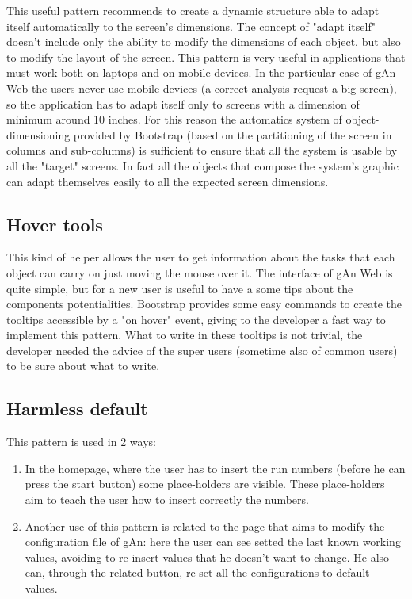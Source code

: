 This useful pattern recommends to create a dynamic structure able to adapt itself automatically to the screen's dimensions. The concept of "adapt itself" doesn't include only the ability to modify the dimensions of each object, but also to modify the layout of the screen. This pattern is very useful in applications that must work both on laptops and on mobile devices. In the particular case of gAn Web the users never use mobile devices (a correct analysis request a big screen), so the application has to adapt itself only to screens with a dimension of minimum around 10 inches. For this reason the automatics system of object-dimensioning provided by Bootstrap (based on the partitioning of the screen in columns and sub-columns) is sufficient to ensure that all the system is usable by all the "target" screens. In fact all the objects that compose the system's graphic can adapt themselves easily to all the expected screen dimensions. 


\subsection{Hover tools}

This kind of helper allows the user to get information about the tasks that each object can carry on just moving the mouse over it. 
The interface of gAn Web is quite simple, but for a new user is useful to have a some tips about the components potentialities. Bootstrap provides some easy commands to create the tooltips accessible by a "on hover" event, giving to the developer a fast way to implement this pattern. What to write in these tooltips is not trivial, the developer needed the advice of the super users (sometime also of common users) to be sure about what to write. 


\subsection{Harmless default}

This pattern is used in 2 ways:
\begin{enumerate}

\item In the homepage, where the user has to insert the run numbers (before he can press the start button) some place-holders are visible. 
These place-holders aim to teach the user how to insert correctly the numbers.

\item Another use of this pattern is related to the page that aims to modify the configuration file of gAn: here the user can see setted the last known working values, avoiding to re-insert values that he doesn't want to change. He also can, through the related  button, re-set all the configurations to default values.

\end{enumerate}

